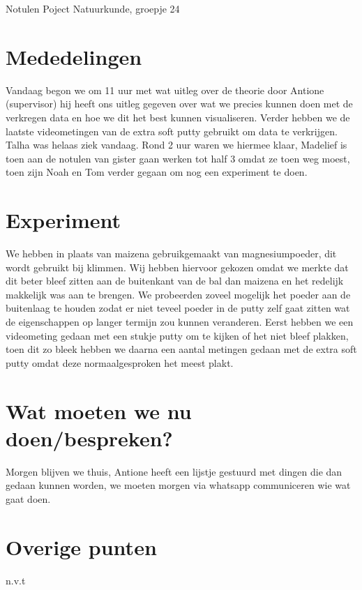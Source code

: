 \documentclass[11pt,a4paper]{article}
\begin{document}
\begin{Minutes}{Notulen Poject Natuurkunde, groepje 24}


\endtime{}
\location{}




\maketitle



\newpage


\section{Mededelingen} 
Vandaag begon we om 11 uur met wat uitleg over de theorie door Antione (supervisor) hij heeft ons uitleg gegeven over wat we precies kunnen doen met de verkregen data en hoe we dit het best kunnen visualiseren. Verder hebben we de laatste videometingen van de extra soft putty gebruikt om data te verkrijgen. Talha was helaas ziek vandaag. Rond 2 uur waren we hiermee klaar, Madelief is toen aan de notulen van gister gaan werken tot half 3 omdat ze toen weg moest, toen zijn Noah en Tom verder gegaan om nog een experiment te doen.

\section{Experiment}
We hebben in plaats van maizena gebruikgemaakt van magnesiumpoeder, dit wordt gebruikt bij klimmen. Wij hebben hiervoor gekozen omdat we merkte dat dit beter bleef zitten aan de buitenkant van de bal dan maizena en het redelijk makkelijk was aan te brengen. We probeerden zoveel mogelijk het poeder aan de buitenlaag te houden zodat er niet teveel poeder in de putty zelf gaat zitten wat de eigenschappen op langer termijn zou kunnen veranderen. Eerst hebben we een videometing gedaan met een stukje putty om te kijken of het niet bleef plakken, toen dit zo bleek hebben we daarna een aantal metingen gedaan met de extra soft putty omdat deze normaalgesproken het meest plakt. 


\section{Wat moeten we nu doen/bespreken?}
Morgen blijven we thuis, Antione heeft een lijstje gestuurd met dingen die dan gedaan kunnen worden, we moeten morgen via whatsapp communiceren wie wat gaat doen.

\section{Overige punten}
n.v.t

\end{Minutes}
\end{document}
